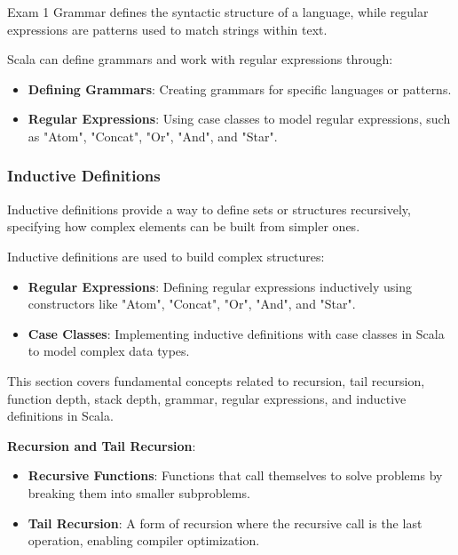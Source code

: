 \begin{examnotes}{Exam 1}
    Grammar defines the syntactic structure of a language, while regular expressions are patterns used to match strings within text.
    
    \begin{highlight}
        Scala can define grammars and work with regular expressions through:
        \begin{itemize}
            \item \textbf{Defining Grammars}: Creating grammars for specific languages or patterns.
            \item \textbf{Regular Expressions}: Using case classes to model regular expressions, such as "Atom", "Concat", "Or", "And", and "Star".
        \end{itemize}
    \end{highlight}
    
    \subsubsection*{Inductive Definitions}
    
    Inductive definitions provide a way to define sets or structures recursively, specifying how complex elements can be built from simpler ones.
    
    \begin{highlight}
        Inductive definitions are used to build complex structures:
        \begin{itemize}
            \item \textbf{Regular Expressions}: Defining regular expressions inductively using constructors like "Atom", "Concat", "Or", "And", and "Star".
            \item \textbf{Case Classes}: Implementing inductive definitions with case classes in Scala to model complex data types.
        \end{itemize}
    \end{highlight}

    \begin{highlight}
        This section covers fundamental concepts related to recursion, tail recursion, function depth, stack depth, grammar, regular expressions, and inductive definitions in Scala. \vspace*{1em}
    
        \textbf{Recursion and Tail Recursion}:
        \begin{itemize}
            \item \textbf{Recursive Functions}: Functions that call themselves to solve problems by breaking them into smaller subproblems.
            \item \textbf{Tail Recursion}: A form of recursion where the recursive call is the last operation, enabling compiler optimization.
        \end{itemize}
        

\end{highlight}
\end{examnotes}
